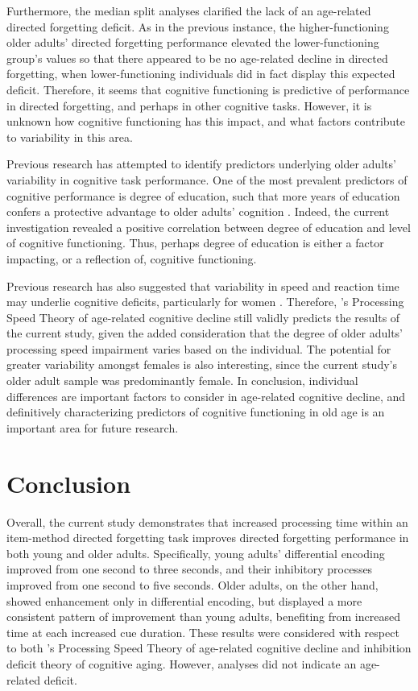 \documentclass[man]{apa6}\usepackage[]{graphicx}\usepackage[]{color}
\begin{document}
Furthermore, the median split analyses clarified the lack of an age-related directed forgetting deficit. As in the previous instance, the higher-functioning older adults’ directed forgetting performance elevated the lower-functioning group’s values so that there appeared to be no age-related decline in directed forgetting, when lower-functioning individuals did in fact display this expected deficit. Therefore, it seems that cognitive functioning is predictive of performance in directed forgetting, and perhaps in other cognitive tasks. However, it is unknown how cognitive functioning has this impact, and what factors contribute to variability in this area.

Previous research has attempted to identify predictors underlying older adults’ variability in cognitive task performance. One of the most prevalent predictors of cognitive performance is degree of education, such that more years of education confers a protective advantage to older adults’ cognition \parencite{christensen.et.al1999,anstey.christensen2000,christensen2001}. Indeed, the current investigation revealed a positive correlation between degree of education and level of cognitive functioning. Thus, perhaps degree of education is either a factor impacting, or a reflection of, cognitive functioning.

Previous research has also suggested that variability in speed and reaction time may underlie cognitive deficits, particularly for women \parencite{morse1993,christensen.et.al1999,christensen2001}. Therefore, \textcite{salthouse1996}'s Processing Speed Theory of age-related cognitive decline still validly predicts the results of the current study, given the added consideration that the degree of older adults’ processing speed impairment varies based on the individual. The potential for greater variability amongst females is also interesting, since the current study’s older adult sample was predominantly female. In conclusion, individual differences are important factors to consider in age-related cognitive decline, and definitively characterizing predictors of cognitive functioning in old age is an important area for future research.

\section*{Conclusion}

Overall, the current study demonstrates that increased processing time within an item-method directed forgetting task improves directed forgetting performance in both young and older adults. Specifically, young adults’ differential encoding improved from one second to three seconds, and their inhibitory processes improved from one second to five seconds. Older adults, on the other hand, showed enhancement only in differential encoding, but displayed a more consistent pattern of improvement than young adults, benefiting from increased time at each increased cue duration. These results were considered with respect to both \textcite{salthouse1996}'s Processing Speed Theory of age-related cognitive decline and \textcite{hasher.zacks1988} inhibition deficit theory of cognitive aging. However, analyses did not indicate an age-related deficit.
\end{document}
